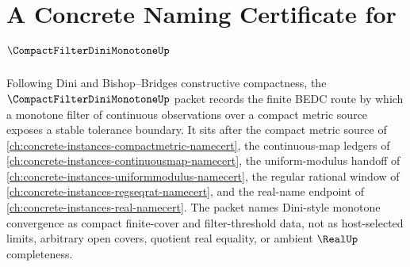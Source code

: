 \chapter{A Concrete Naming Certificate for $\CompactFilterDiniMonotoneUp$}
\label{ch:concrete-instances-compact-filter-dini-monotone-namecert}

Following Dini and Bishop--Bridges constructive compactness, the $\CompactFilterDiniMonotoneUp$ packet records the finite BEDC route by which a monotone filter of continuous observations over a compact metric source exposes a stable tolerance boundary. It sits after the compact metric source of \autoref{ch:concrete-instances-compactmetric-namecert}, the continuous-map ledgers of \autoref{ch:concrete-instances-continuousmap-namecert}, the uniform-modulus handoff of \autoref{ch:concrete-instances-uniformmodulus-namecert}, the regular rational window of \autoref{ch:concrete-instances-regseqrat-namecert}, and the real-name endpoint of \autoref{ch:concrete-instances-real-namecert}. The packet names Dini-style monotone convergence as compact finite-cover and filter-threshold data, not as host-selected limits, arbitrary open covers, quotient real equality, or ambient $\RealUp$ completeness.

